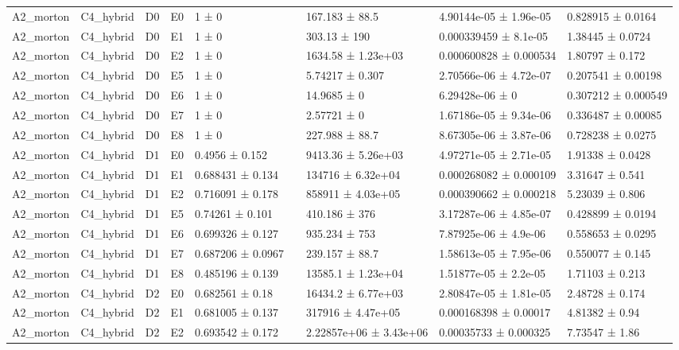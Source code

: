 \begin{table}
\begin{tabular}{lllllllll}
A2\_morton & C4\_hybrid & D0 & E0 & 1 ± 0 &  & 167.183 ± 88.5 & 4.90144e-05 ± 1.96e-05 & 0.828915 ± 0.0164 \\
A2\_morton & C4\_hybrid & D0 & E1 & 1 ± 0 &  & 303.13 ± 190 & 0.000339459 ± 8.1e-05 & 1.38445 ± 0.0724 \\
A2\_morton & C4\_hybrid & D0 & E2 & 1 ± 0 &  & 1634.58 ± 1.23e+03 & 0.000600828 ± 0.000534 & 1.80797 ± 0.172 \\
A2\_morton & C4\_hybrid & D0 & E5 & 1 ± 0 &  & 5.74217 ± 0.307 & 2.70566e-06 ± 4.72e-07 & 0.207541 ± 0.00198 \\
A2\_morton & C4\_hybrid & D0 & E6 & 1 ± 0 &  & 14.9685 ± 0 & 6.29428e-06 ± 0 & 0.307212 ± 0.000549 \\
A2\_morton & C4\_hybrid & D0 & E7 & 1 ± 0 &  & 2.57721 ± 0 & 1.67186e-05 ± 9.34e-06 & 0.336487 ± 0.00085 \\
A2\_morton & C4\_hybrid & D0 & E8 & 1 ± 0 &  & 227.988 ± 88.7 & 8.67305e-06 ± 3.87e-06 & 0.728238 ± 0.0275 \\
A2\_morton & C4\_hybrid & D1 & E0 & 0.4956 ± 0.152 &  & 9413.36 ± 5.26e+03 & 4.97271e-05 ± 2.71e-05 & 1.91338 ± 0.0428 \\
A2\_morton & C4\_hybrid & D1 & E1 & 0.688431 ± 0.134 &  & 134716 ± 6.32e+04 & 0.000268082 ± 0.000109 & 3.31647 ± 0.541 \\
A2\_morton & C4\_hybrid & D1 & E2 & 0.716091 ± 0.178 &  & 858911 ± 4.03e+05 & 0.000390662 ± 0.000218 & 5.23039 ± 0.806 \\
A2\_morton & C4\_hybrid & D1 & E5 & 0.74261 ± 0.101 &  & 410.186 ± 376 & 3.17287e-06 ± 4.85e-07 & 0.428899 ± 0.0194 \\
A2\_morton & C4\_hybrid & D1 & E6 & 0.699326 ± 0.127 &  & 935.234 ± 753 & 7.87925e-06 ± 4.9e-06 & 0.558653 ± 0.0295 \\
A2\_morton & C4\_hybrid & D1 & E7 & 0.687206 ± 0.0967 &  & 239.157 ± 88.7 & 1.58613e-05 ± 7.95e-06 & 0.550077 ± 0.145 \\
A2\_morton & C4\_hybrid & D1 & E8 & 0.485196 ± 0.139 &  & 13585.1 ± 1.23e+04 & 1.51877e-05 ± 2.2e-05 & 1.71103 ± 0.213 \\
A2\_morton & C4\_hybrid & D2 & E0 & 0.682561 ± 0.18 &  & 16434.2 ± 6.77e+03 & 2.80847e-05 ± 1.81e-05 & 2.48728 ± 0.174 \\
A2\_morton & C4\_hybrid & D2 & E1 & 0.681005 ± 0.137 &  & 317916 ± 4.47e+05 & 0.000168398 ± 0.00017 & 4.81382 ± 0.94 \\
A2\_morton & C4\_hybrid & D2 & E2 & 0.693542 ± 0.172 &  & 2.22857e+06 ± 3.43e+06 & 0.00035733 ± 0.000325 & 7.73547 ± 1.86 \\

\end{tabular}
\end{table}

